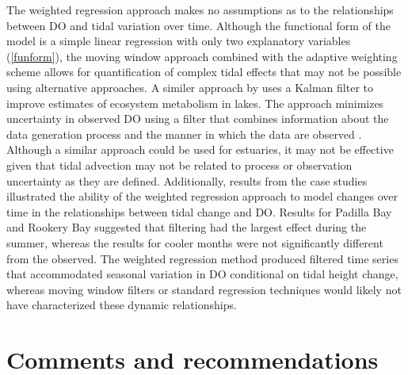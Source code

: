 \documentclass[letterpaper,12pt,oneside]{article}\usepackage[]{graphicx}\usepackage[]{color}
\begin{document}
The weighted regression approach makes no assumptions as to the relationships between \ac{DO} and tidal variation over time.  Although the functional form of the model is a simple linear regression with only two explanatory variables (\cref{funform}), the moving window approach combined with the adaptive weighting scheme allows for quantification of complex tidal effects that may not be possible using alternative approaches.  A similer approach by \citet{Batt12} uses a Kalman filter to improve estimates of ecosystem metabolism in lakes.  The approach minimizes uncertainty in observed \ac{DO} using a filter that combines information about the data generation process and the manner in which the data are observed \citep{Harvey89}.  Although a similar approach could be used for estuaries, it may not be effective given that tidal advection may not be related to process or observation uncertainty as they are defined.  Additionally, results from the case studies illustrated the ability of the weighted regression approach to model changes over time in the relationships between tidal change and \ac{DO}.  Results for Padilla Bay and Rookery Bay suggested that filtering had the largest effect during the summer, whereas the results for cooler months were not significantly different from the observed.  The weighted regression method produced filtered time series that accommodated seasonal variation in \ac{DO} conditional on tidal height change, whereas moving window filters or standard regression techniques would likely not have characterized these dynamic relationships.

\section{Comments and recommendations}
\end{document}
